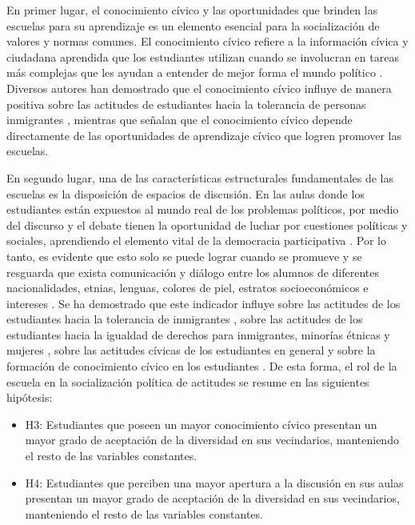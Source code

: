 \documentclass[12pt,twoside]{templates/facsothesis}
\begin{document}
En primer lugar, el conocimiento cívico y las oportunidades que brinden las escuelas para su aprendizaje es un elemento esencial para la socialización de valores y normas comunes. El conocimiento cívico refiere a la información cívica y ciudadana aprendida que los estudiantes utilizan cuando se involucran en tareas más complejas que les ayudan a entender de mejor forma el mundo político \citep{carstens_Overview_2018}. Diversos autores han demostrado que el conocimiento cívico influye de manera positiva sobre las actitudes de estudiantes hacia la tolerancia de personas inmigrantes \citep{isac_Native_2012, groof_Influence_2008, torney-purta_How_2008}, mientras que \citet{sampermans_Back_2020} señalan que el conocimiento cívico depende directamente de las oportunidades de aprendizaje cívico que logren promover las escuelas.

En segundo lugar, una de las características estructurales fundamentales de las escuelas es la disposición de espacios de discusión. En las aulas donde los estudiantes están expuestos al mundo real de los problemas políticos, por medio del discurso y el debate tienen la oportunidad de luchar por cuestiones políticas y sociales, aprendiendo el elemento vital de la democracia participativa \citep{campbell_Voice_2008}. Por lo tanto, es evidente que esto solo se puede lograr cuando se promueve y se resguarda que exista comunicación y diálogo entre los alumnos de diferentes nacionalidades, etnias, lenguas, colores de piel, estratos socioeconómicos e intereses \citep{riedemann_Desde_2020}. Se ha demostrado que este indicador influye sobre las actitudes de los estudiantes hacia la tolerancia de inmigrantes \citep{maurissen_Classroom_2020, groof_Influence_2008, isac_Native_2012}, sobre las actitudes de los estudiantes hacia la igualdad de derechos para inmigrantes, minorías étnicas y mujeres \citep{trevino_Influence_2018, trevino_Influence_2017}, sobre las actitudes cívicas de los estudiantes en general \citep{barber_Profiles_2020} y sobre la formación de conocimiento cívico en los estudiantes \citep{sampermans_Back_2020, barber_Immigrant_2015}. De esta forma, el rol de la escuela en la socialización política de actitudes se resume en las siguientes hipótesis:

\begin{itemize}
\item
  H3: Estudiantes que poseen un mayor conocimiento cívico presentan un mayor grado de aceptación de la diversidad en sus vecindarios, manteniendo el resto de las variables constantes.
\item
  H4: Estudiantes que perciben una mayor apertura a la discusión en sus aulas presentan un mayor grado de aceptación de la diversidad en sus vecindarios, manteniendo el resto de las variables constantes.
\end{itemize}
\end{document}

